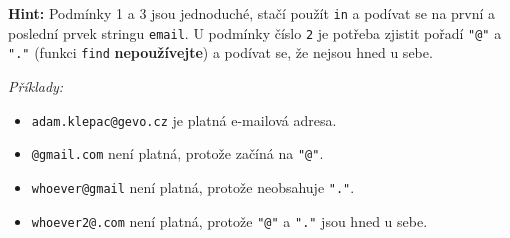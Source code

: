 \documentclass[a4paper,11pt]{article}
\begin{document}
\textbf{Hint:} Podmínky 1 a 3 jsou jednoduché, stačí použít \texttt{in} a
podívat se na první a poslední prvek stringu \texttt{email}. U podmínky číslo
\texttt{2} je potřeba zjistit pořadí \texttt{"@"} a \texttt{"."} (funkci
\texttt{find} \textbf{nepoužívejte}) a podívat se, že nejsou hned u sebe.

\emph{Příklady:}
\begin{itemize}
 \item \texttt{adam.klepac@gevo.cz} je platná e-mailová adresa.
 \item \texttt{@gmail.com} není platná, protože začíná na \texttt{"@"}.
 \item \texttt{whoever@gmail} není platná, protože neobsahuje \texttt{"."}.
 \item \texttt{whoever2@.com} není platná, protože \texttt{"@"} a \texttt{"."}
  jsou hned u sebe.
\end{itemize}
\end{document}
